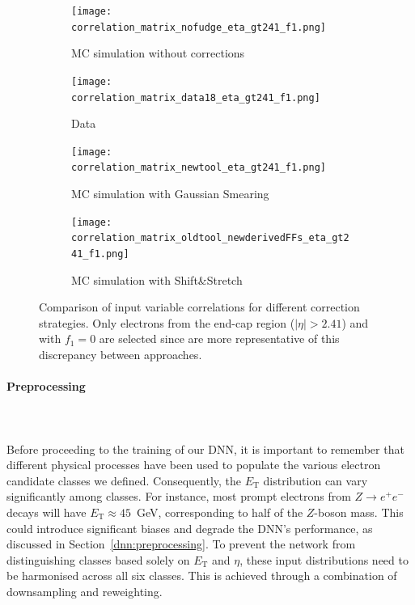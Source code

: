 \begin{figure}[htbp]
  \centering
  \begin{subfigure}[b]{0.45\textwidth}
      \centering
      \texttt{[image: correlation\_matrix\_nofudge\_eta\_gt241\_f1.png]}
      \caption{MC simulation without corrections}
      \label{fig:corr_nominal}
  \end{subfigure}
  \hfill
  \begin{subfigure}[b]{0.45\textwidth}
      \centering
      \texttt{[image: correlation\_matrix\_data18\_eta\_gt241\_f1.png]}
      \caption{Data}
      \label{fig:corr_data}
  \end{subfigure}
  \vspace{0.4cm}
  \begin{subfigure}[b]{0.45\textwidth}
      \centering
      \texttt{[image: correlation\_matrix\_newtool\_eta\_gt241\_f1.png]}
      \caption{MC simulation with Gaussian Smearing}
      \label{fig:corr_smearing}
  \end{subfigure}
  \hfill
  \begin{subfigure}[b]{0.45\textwidth}
      \centering
      \texttt{[image: correlation\_matrix\_oldtool\_newderivedFFs\_eta\_gt241\_f1.png]}
      \caption{MC simulation with Shift\&Stretch}
      \label{fig:corr_shiftstretch}
  \end{subfigure}
  \caption{Comparison of input variable correlations for different correction strategies. Only electrons from the end-cap region ($|\eta|>2.41$) and with $f_{1}=0$ are selected since are more representative of this discrepancy between approaches.}
  \label{fig:correlations}
\end{figure}

\paragraph{Preprocessing} \mbox{}\\
\\
Before proceeding to the training of our DNN, it is important to remember that different physical processes have been used to populate the various electron candidate classes we defined. Consequently, the $E_{\text{T}}$ distribution can vary significantly among classes. For instance, most prompt electrons from $Z \to e^{+}e^{-}$ decays will have $E_{\text{T}} \approx 45$~GeV, corresponding to half of the $Z$-boson mass. This could introduce significant biases and degrade the DNN’s performance, as discussed in Section~\ref{dnn:preprocessing}.
To prevent the network from distinguishing classes based solely on $E_{\text{T}}$ and $\eta$, these input distributions need to be harmonised across all six classes. This is achieved through a combination of downsampling and reweighting.

